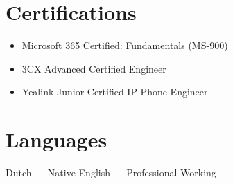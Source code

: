 \documentclass[a4paper,10pt]{article}
\begin{document}
\section{Certifications}

\begin{itemize}[leftmargin=12pt]
  \item Microsoft 365 Certified: Fundamentals (MS-900)
  \item 3CX Advanced Certified Engineer
  \item Yealink Junior Certified IP Phone Engineer
\end{itemize}

\section{Languages}

Dutch --- Native \quad English --- Professional Working
\end{document}
